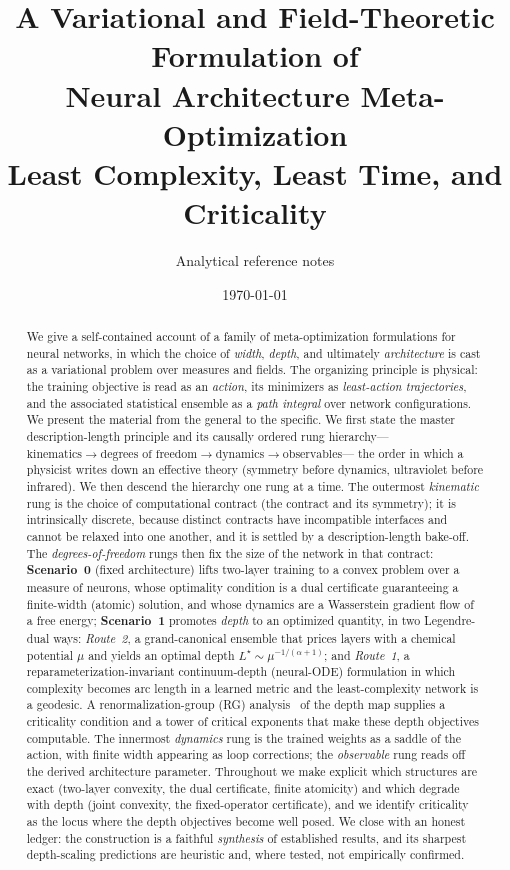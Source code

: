 \documentclass[11pt]{article}
\title{\bf A Variational and Field-Theoretic Formulation of\\
Neural Architecture Meta-Optimization\\[4pt]
\large Least Complexity, Least Time, and Criticality}
\author{Analytical reference notes}
\date{\today}
\theoremstyle{definition}
\newcommand{\Lstar}{L^{\star}}
\begin{document}
\maketitle

\begin{abstract}
We give a self-contained account of a family of meta-optimization formulations for
neural networks, in which the choice of \emph{width}, \emph{depth}, and ultimately
\emph{architecture} is cast as a variational problem over measures and fields. The
organizing principle is physical: the training objective is read as an \emph{action},
its minimizers as \emph{least-action trajectories}, and the associated statistical
ensemble as a \emph{path integral} over network configurations. We present the material
from the general to the specific. We first state the master description-length principle
and its causally ordered rung hierarchy---%
$\text{kinematics}\to\text{degrees of freedom}\to\text{dynamics}\to\text{observables}$---%
the order in which a physicist writes down an effective theory (symmetry before dynamics,
ultraviolet before infrared). We then descend the hierarchy one rung at a time. The
outermost \emph{kinematic} rung is the choice of computational contract (the contract and its
symmetry); it is intrinsically discrete, because distinct contracts have incompatible
interfaces and cannot be relaxed into one another, and it is settled by a description-length
bake-off. The \emph{degrees-of-freedom} rungs then fix the size of the network in that contract:
\textbf{Scenario~0} (fixed architecture) lifts
two-layer training to a convex problem over a measure of neurons, whose optimality
condition is a dual certificate guaranteeing a finite-width (atomic) solution, and
whose dynamics are a Wasserstein gradient flow of a free energy; \textbf{Scenario~1} promotes
\emph{depth} to an optimized quantity, in two
Legendre-dual ways: \emph{Route~2}, a grand-canonical ensemble that prices layers with a
chemical potential $\mu$ and yields an optimal depth $\Lstar\sim\mu^{-1/(\alpha+1)}$; and
\emph{Route~1}, a reparameterization-invariant continuum-depth (neural-ODE) formulation
in which complexity becomes arc length in a learned metric and the least-complexity
network is a geodesic. A renormalization-group (RG) analysis~\cite{mehta2014rg} of the depth map supplies a
criticality condition and a tower of critical exponents that make these depth objectives
computable. The innermost \emph{dynamics} rung is the trained weights as a saddle of the
action, with finite width appearing as loop corrections; the \emph{observable} rung reads
off the derived architecture parameter. Throughout we make explicit which structures are exact
(two-layer convexity, the dual certificate, finite atomicity) and which degrade with
depth (joint convexity, the fixed-operator certificate), and we identify criticality~\cite{poole2016chaos,schoenholz2017deepinfo} as
the locus where the depth objectives become well posed. We close with an honest ledger:
the construction is a faithful \emph{synthesis} of established results, and its sharpest
depth-scaling predictions are heuristic and, where tested, not empirically confirmed.
\end{abstract}
\end{document}

